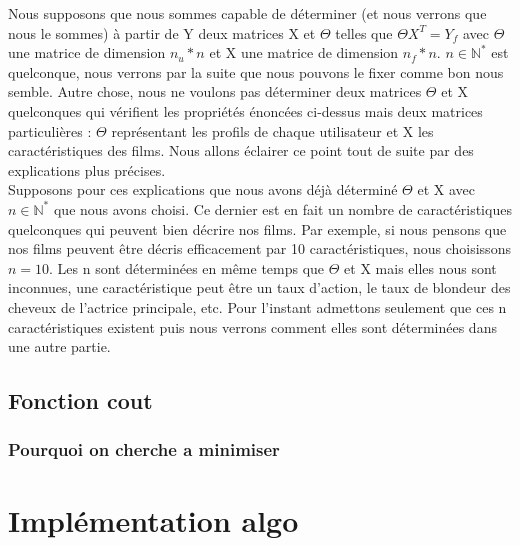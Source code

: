 \documentclass[a4paper,10pt]{article}
\begin{document}
Nous supposons que nous sommes capable de déterminer (et nous verrons que nous le sommes) à partir de Y deux matrices X et $\Theta$ telles que $\Theta X^T = Y_f$ avec $\Theta$ une matrice de dimension $n_u * n$ et X une matrice de dimension $n_f * n$. $n \in \mathbb{N}^*$ est quelconque, nous verrons par la suite que nous pouvons le fixer comme bon nous semble. 
Autre chose, nous ne voulons pas déterminer deux matrices $\Theta$ et X quelconques qui vérifient les propriétés énoncées ci-dessus mais deux matrices particulières : $\Theta$ représentant les profils de chaque utilisateur et X les caractéristiques des films. Nous allons éclairer ce point tout de suite par des explications plus précises.\\ 
 
Supposons pour ces explications que nous avons déjà déterminé $\Theta$ et X avec $n \in \mathbb{N}^*$ que nous avons choisi. Ce dernier est en fait un nombre de caractéristiques quelconques qui peuvent bien décrire nos films. Par exemple, si nous pensons que nos films peuvent être décris efficacement par 10 caractéristiques, nous choisissons $n = 10$. 
Les n sont déterminées en même temps que $\Theta$ et X mais elles nous sont inconnues, une caractéristique peut être un taux d'action, le taux de blondeur des cheveux de l'actrice principale, etc. Pour l'instant admettons seulement que ces n caractéristiques existent puis nous verrons comment elles sont déterminées dans une autre partie. 



\subsection{Fonction cout}
\subsubsection{Pourquoi on cherche a minimiser}
\section{Implémentation algo}
\end{document}
